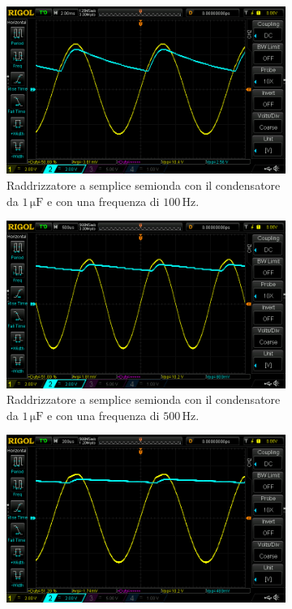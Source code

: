 \documentclass[a4paper]{article}
\begin{document}
				\begin{figure}[h!]
					\centering
					\begin{subfigure}{0.4\textwidth}
						\centering
						\includegraphics[scale=0.2]{raddrizzatoreASempliceSemionda1micro100}
						\caption{Raddrizzatore a semplice semionda con il condensatore da $ 1 \, \mathrm{\mu F} $ e con una frequenza di $ 100 \, \mathrm{Hz} $.}
					\end{subfigure}
					\begin{subfigure}{0.4\textwidth}
						\centering
						\includegraphics[scale=0.2]{raddrizzatoreASempliceSemionda1micro500}
						\caption{Raddrizzatore a semplice semionda con il condensatore da $ 1 \, \mathrm{\mu F} $ e con una frequenza di $ 500 \, \mathrm{Hz} $.}
					\end{subfigure}
					\begin{subfigure}{1\textwidth}
						\centering
						\includegraphics[scale=0.3]{raddrizzatoreASempliceSemionda1micro1k}

\end{subfigure}
\end{figure}
\end{document}
